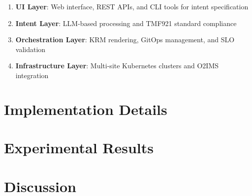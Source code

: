 \documentclass[conference]{IEEEtran}
\begin{document}
\begin{enumerate}
\item \textbf{UI Layer}: Web interface, REST APIs, and CLI tools for intent specification
\item \textbf{Intent Layer}: LLM-based processing and TMF921 standard compliance
\item \textbf{Orchestration Layer}: KRM rendering, GitOps management, and SLO validation
\item \textbf{Infrastructure Layer}: Multi-site Kubernetes clusters and O2IMS integration
\end{enumerate}




\section{Implementation Details}
\label{sec:implementation}




\section{Experimental Results}
\label{sec:evaluation}




\section{Discussion}
\label{sec:discussion}



\end{document}
